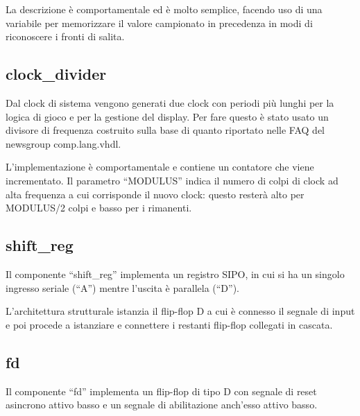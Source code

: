 \documentclass [11pt,a4paper,oneside]{article}
\begin{document}


La descrizione è comportamentale ed è molto semplice, facendo uso di
una variabile per memorizzare il valore campionato in precedenza in
modi di riconoscere i fronti di salita.



\subsection{clock\_divider}

Dal clock di sistema vengono generati due clock con periodi più
lunghi per la logica di gioco e per la gestione del display.
Per fare questo è stato usato un divisore di frequenza costruito
sulla base di quanto riportato nelle FAQ del newsgroup
comp.lang.vhdl.



L'implementazione è comportamentale e contiene un contatore che viene
incrementato. Il parametro ``MODULUS'' indica il numero di colpi di
clock ad alta frequenza a cui corrisponde il nuovo clock: questo
resterà alto per MODULUS/2 colpi e basso per i rimanenti.



\subsection{shift\_reg}

Il componente ``shift\_reg'' implementa un registro SIPO, in cui
si ha un singolo ingresso seriale (``A'') mentre l'uscita è
parallela (``D'').



L'architettura strutturale istanzia il flip-flop D a cui è connesso
il segnale di input e poi procede a istanziare e connettere i restanti
flip-flop collegati in cascata.



\subsection{fd}

Il componente ``fd'' implementa un flip-flop di tipo D con segnale di
reset asincrono attivo basso e un segnale di abilitazione anch'esso
attivo basso.
\end{document}
